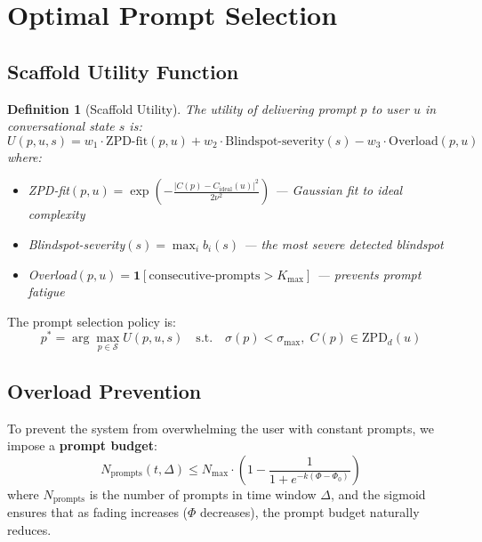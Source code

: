 \documentclass[12pt,a4paper]{article}
\newtheorem{definition}{Definition}[section]
\theoremstyle{remark}
\newcommand{\CS}{\mathcal{S}}
\newcommand{\indicator}{\mathbf{1}}
\begin{document}
\section{Optimal Prompt Selection}

\subsection{Scaffold Utility Function}

\begin{definition}[Scaffold Utility]
The utility of delivering prompt $p$ to user $u$ in conversational state $s$ is:
\begin{equation}
U(p, u, s) = w_1 \cdot \text{ZPD-fit}(p, u) + w_2 \cdot \text{Blindspot-severity}(s) - w_3 \cdot \text{Overload}(p, u)
\label{eq:utility}
\end{equation}
where:
\begin{itemize}
    \item ZPD-fit$(p, u) = \exp(-\frac{|C(p) - C_{\text{ideal}}(u)|^2}{2\nu^2})$ — Gaussian fit to ideal complexity
    \item Blindspot-severity$(s) = \max_i b_i(s)$ — the most severe detected blindspot
    \item Overload$(p, u) = \indicator[\text{consecutive-prompts} > K_{\max}]$ — prevents prompt fatigue
\end{itemize}
\end{definition}

The prompt selection policy is:
\begin{equation}
p^* = \arg\max_{p \in \CS} U(p, u, s) \quad \text{s.t.} \quad \sigma(p) < \sigma_{\max}, \; C(p) \in \text{ZPD}_d(u)
\end{equation}

\subsection{Overload Prevention}

To prevent the system from overwhelming the user with constant prompts, we impose a \textbf{prompt budget}:
\begin{equation}
N_{\text{prompts}}(t, \Delta) \leq N_{\max} \cdot \left(1 - \frac{1}{1 + e^{-k(\Phi - \Phi_0)}}\right)
\end{equation}
where $N_{\text{prompts}}$ is the number of prompts in time window $\Delta$, and the sigmoid ensures that as fading increases ($\Phi$ decreases), the prompt budget naturally reduces.
\end{document}

